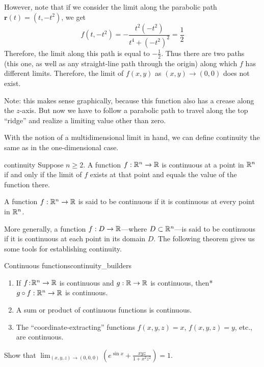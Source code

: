 \documentclass[svgnames]{watsonbook}
\begin{document}
\begin{solution}
  However, note that if we consider the limit along the parabolic
  path $\mathbf{r}(t) = (t, -t^2)$, we get
  \[
    f(t,-t^2) = -\frac{t^2(-t^2)}{t^4+(-t^2)^2} = \frac{1}{2}
  \]
  Therefore, the limit along this path is equal to
  $-\tfrac{1}{2}$. Thus there are two paths (this one, as well as
  any straight-line path through the origin) along which $f$ has
  different limits. Therefore, the limit of $f(x,y)$ as $(x,y) \to
  (0,0)$ does not exist.
  
  Note: this makes sense graphically, because this function also has a
  crease along the $z$-axis. But now we have to follow a
  parabolic path to travel along the top ``ridge'' and realize a
  limiting value other than zero.
\end{solution}

With the notion of a multidimensional limit in hand, we can define
continuity the same as in the one-dimensional case. 

\begin{defn}{}{continuity}
  Suppose $n \geq 2$. A function $f: \mathbb{R}^n \to \mathbb{R}$ is continuous at a
  point in $\mathbb{R}^n$ if and only if the limit of $f$ exists at that point
  and equals the value of the function there.

  A function $f: \mathbb{R}^n \to \mathbb{R}$ is said to be continuous if it is
  continuous at every point in $\mathbb{R}^n$. 
\end{defn}

More generally, a function $f:D \to \mathbb{R}$---where $D \subset \mathbb{R}^n$---is
said to be continuous if it is continuous at each point in its
domain $D$. The following theorem gives us some tools for establishing
continuity. 

\begin{theo}{Continuous functions}{continuity_builders}
  \begin{enumerate} 
    \item If $f  \!:\! \mathbb{R}^n \to \mathbb{R}$ is continuous and $g: \mathbb{R} \to \mathbb{R}$
    is continuous, then* $g\circ f :\mathbb{R}^n \to \mathbb{R}$ is
    continuous. 
  \item A sum or product of continuous functions is continuous. 
  \item The ``coordinate-extracting'' functions $f(x,y,z) = x$, $f(x,y,z) = y$, etc., are
    continuous.
  \end{enumerate}
\end{theo}

\begin{example}{}{}
  Show that $\displaystyle{\lim_{(x,y,z) \to (0,0,0)}\left(e^{\sin x} + \frac{xyz}{1 + x^2
    z^2}\right)} = 1$. 
\end{example}
\end{document}
